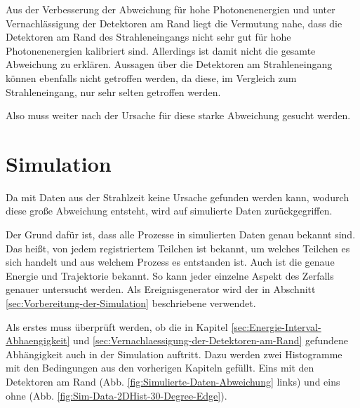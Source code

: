 \documentclass[a4paper,11pt,oneside,final,german,openbib,pdftex]{scrbook}
\begin{document}
{Aus der Verbesserung der Abweichung f\"ur hohe Photonenenergien und unter Vernachl\"assigung der Detektoren am Rand liegt die Vermutung nahe, dass die Detektoren am Rand des Strahleneingangs nicht sehr gut f\"ur hohe Photonenenergien kalibriert sind. 
Allerdings ist damit nicht die gesamte Abweichung zu erkl\"aren. 
Aussagen \"uber die Detektoren am Strahleneingang k\"onnen ebenfalls nicht getroffen werden, da diese, im Vergleich zum Strahleneingang, nur sehr selten getroffen werden.

Also muss weiter nach der Ursache f\"ur diese starke Abweichung gesucht werden.



\section{Simulation}
\label{sec:Simulation}

Da mit Daten aus der Strahlzeit keine Ursache gefunden werden kann, wodurch diese gro{\ss}e Abweichung entsteht, wird auf simulierte Daten zur\"uckgegriffen. 

Der Grund daf\"ur ist, dass alle Prozesse in simulierten Daten genau bekannt sind. Das hei{\ss}t, von jedem registriertem Teilchen ist bekannt, um welches Teilchen es sich handelt und aus welchem Prozess es entstanden ist. Auch ist die genaue Energie und Trajektorie bekannt. 
So kann jeder einzelne Aspekt des Zerfalls genauer untersucht werden.
Als Ereignisgenerator wird der in Abschnitt \ref{sec:Vorbereitung-der-Simulation} beschriebene verwendet.

Als erstes muss \"uberpr\"uft werden, ob die in Kapitel \ref{sec:Energie-Interval-Abhaengigkeit} und \ref{sec:Vernachlaessigung-der-Detektoren-am-Rand} gefundene Abh\"angigkeit auch in der Simulation auftritt. 
Dazu werden zwei Histogramme mit den Bedingungen aus den vorherigen Kapiteln gef\"ullt. Eins mit den Detektoren am Rand (Abb. \ref{fig:Simulierte-Daten-Abweichung} links) und eins ohne (Abb. \ref{fig:Sim-Data-2DHist-30-Degree-Edge}).


}
\end{document}
